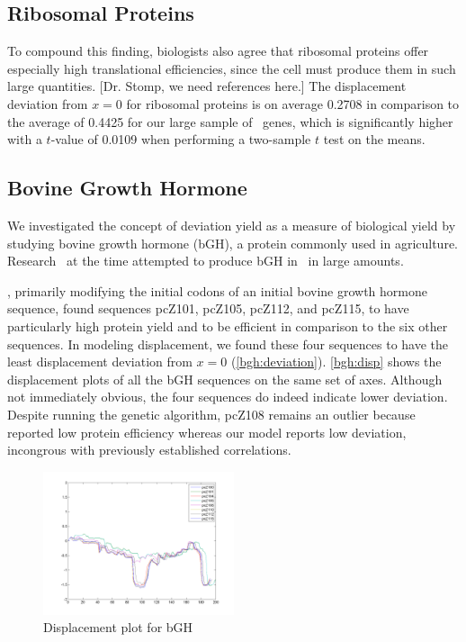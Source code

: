 \documentclass[12pt]{article}
\numberwithin{equation}{section}
\begin{document}
\subsection{Ribosomal Proteins}
\label{section:riboproteins}

To compound this finding, biologists also agree that ribosomal
proteins offer especially high translational efficiencies, since the
cell must produce them in such large quantities. [Dr. Stomp, we need
  references here.] The displacement deviation from $x=0$ for ribosomal proteins
is on average 0.2708 in comparison to the average of 0.4425 for our
large sample of \ecoli\ genes, which is significantly higher with a $t$-value of
0.0109 when performing a two-sample $t$ test on the means.

\subsection{Bovine Growth Hormone}
\label{section:bgh}

We investigated the concept of deviation yield as a measure of biological
yield by studying bovine growth hormone (bGH), a protein commonly used
in agriculture.
Research~\cite{schoner:bgh} at the time attempted to produce bGH
in \ecoli\ in large amounts.



\citet{schoner:bgh}, primarily modifying the initial codons of an
initial bovine growth hormone sequence, found sequences pcZ101,
pcZ105, pcZ112, and pcZ115, to have particularly high protein yield
and to be efficient in comparison to the six other sequences. In
modeling displacement, we found these four sequences  to have the least
displacement deviation from $x = 0$
(\autoref{bgh:deviation}). \autoref{bgh:disp} shows the displacement
plots of all the bGH sequences on the same set of axes. Although not
immediately obvious, the four sequences do indeed indicate lower
deviation. Despite running the genetic algorithm, pcZ108 remains an
outlier because \citeauthor{schoner:bgh} reported low protein
efficiency whereas our model reports low deviation, incongrous with
previously established correlations.

\begin{figure}
  \caption{Displacement plot for bGH}
  \label{bgh:disp}
  \includegraphics[width=0.5\textwidth]{bgh/all}
\end{figure}
\end{document}
